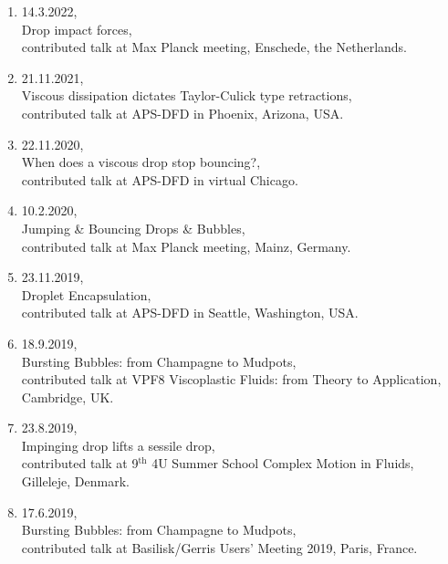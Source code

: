 \documentclass[11pt,a4paper,roman,english,colorlinks,linkcolor={red!50!black}]{moderncv}
\begin{document}
\begin{enumerate}[leftmargin=0.75cm]
	\item 14.3.2022,\\
	Drop impact forces,\\
	contributed talk at Max Planck meeting, Enschede, the Netherlands.

	\item 21.11.2021,\\
	Viscous dissipation dictates Taylor-Culick type retractions,\\
	contributed talk at APS-DFD in Phoenix, Arizona, USA.

	\item 22.11.2020,\\
	When does a viscous drop stop bouncing?,\\
	contributed talk at APS-DFD in virtual Chicago.

	\item 10.2.2020,\\
	Jumping \& Bouncing Drops \& Bubbles,\\
	contributed talk at Max Planck meeting, Mainz, Germany.

	\item 23.11.2019,\\
	Droplet Encapsulation,\\
	contributed talk at APS-DFD in Seattle, Washington, USA.

	\item 18.9.2019,\\
	Bursting Bubbles: from Champagne to Mudpots,\\
	contributed talk at VPF8 Viscoplastic Fluids: from Theory to Application, Cambridge, UK.

	\item 23.8.2019,\\
	Impinging drop lifts a sessile drop,\\
	contributed talk at 9$^\text{th}$ 4U Summer School Complex Motion in Fluids, Gilleleje, Denmark.

	\item 17.6.2019,\\
	Bursting Bubbles: from Champagne to Mudpots,\\
	contributed talk at Basilisk/Gerris Users' Meeting 2019, Paris, France.



\end{enumerate}
\end{document}

